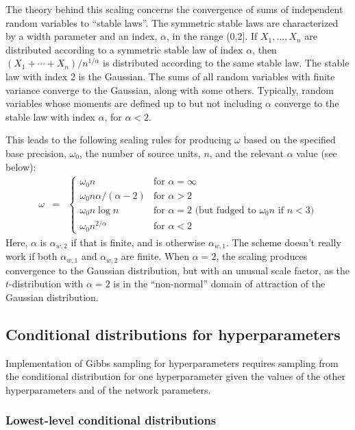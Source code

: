 \documentclass{report}[11pt]
\def\beq{\begin{eqnarray}}
\def\eeq{\end{eqnarray}}
\begin{document}
The theory behind this scaling concerns the convergence of sums of
independent random variables to ``stable laws''.  The symmetric stable
laws are characterized by a width parameter and an index, $\alpha$, in
the range (0,2].  If $X_1,\ldots,X_n$ are distributed according to a
symmetric stable law of index $\alpha$, then
$(X_1+\cdots+X_n)/n^{1/\alpha}$ is distributed according to the same
stable law.  The stable law with index 2 is the Gaussian.  The sums of
all random variables with finite variance converge to the Gaussian,
along with some others.  Typically, random variables whose moments are
defined up to but not including $\alpha$ converge to the stable law
with index $\alpha$, for $\alpha<2$.

This leads to the following scaling rules for producing $\omega$ based 
on the specified base precision, $\omega_0$, the number of source units, $n$,
and the relevant $\alpha$ value (see below):\beq
  \omega & = & \left\{\begin{array}{ll}
     \omega_0 n                         & \mbox{for $\alpha=\infty$} \\[2pt]
     \omega_0 n \alpha / (\alpha\!-\!2) & \mbox{for $\alpha>2$} \\[2pt]
     \omega_0 n \log n                  & \mbox{for $\alpha=2$ 
        \ \ (but fudged to $\omega_0 n$ if $n<3$)} \\[2pt]
     \omega_0 n^{2/\alpha}              & \mbox{for $\alpha<2$} 
  \end{array}\right.
\eeq%
Here, $\alpha$ is $\alpha_{w,2}$ if that is finite, and is otherwise
$\alpha_{w,1}$.  The scheme doesn't really work if both $\alpha_{w,1}$
and $\alpha_{w,2}$ are finite.  When $\alpha=2$, the scaling produces
convergence to the Gaussian distribution, but with an unusual scale
factor, as the $t$-distribution with $\alpha=2$ is in the
``non-normal'' domain of attraction of the Gaussian distribution.


\subsection*{Conditional distributions for hyperparameters}

Implementation of Gibbs sampling for hyperparameters requires sampling
from the conditional distribution for one hyperparameter given the
values of the other hyperparameters and of the network parameters.


\subsubsection*{Lowest-level conditional distributions}
\end{document}
